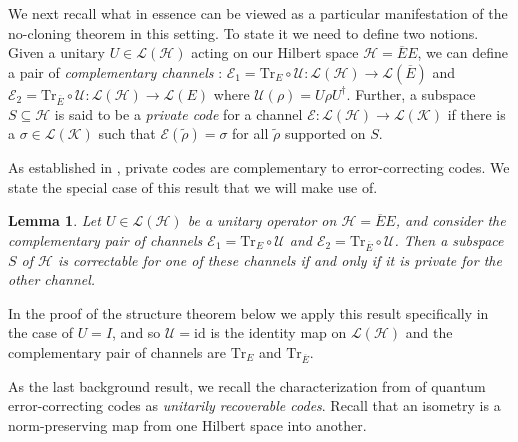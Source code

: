 \documentclass[11pt]{amsart}
\newtheorem{lem}[thm]{Lemma}
\theoremstyle{definition}
\theoremstyle{definition}
\theoremstyle{definition}
\newcommand{\tr}{\textrm{Tr}}
\newcommand{\1}{\mathbb{I}}
\begin{document}
We next recall what in essence can be viewed as a particular manifestation of the no-cloning theorem in this setting. To state it we need to define two notions. Given a unitary $U \in \mathcal L(\mathcal H)$ 
acting on our Hilbert space $\mathcal H = \overline{E}E$, we can define a pair of {\it complementary channels} \cite{holevo2007complementary,king2005properties}: $\mathcal E_1 = \tr_E \circ \mathcal U : \mathcal L(\mathcal H) \rightarrow \mathcal L(\overline{E})$ and $\mathcal E_2 = \tr_{\overline{E}} \circ \mathcal U : \mathcal L(\mathcal H) \rightarrow \mathcal L(E)$ where $\mathcal U(\rho) = U \rho U^\dagger$.  Further, a subspace $S\subseteq \mathcal H$ is said to be a {\it private code} \cite{ambainis2000private,bartlett2005random,bartlett2004decoherence,boykin2003optimal,crann2016private,jochym2013private,kribs2021approximate,levick2017quantum} for a channel $\mathcal E: \mathcal L(\mathcal H) \rightarrow \mathcal L(\mathcal K)$ if there is a $\sigma \in \mathcal L(\mathcal K)$ such that $\mathcal E(\widetilde{\rho}) = \sigma$ for all $\widetilde{\rho}$ supported on $S$. 

As established in \cite{kretschmann2008complementarity}, private codes are complementary to error-correcting codes. We state the special case of this result that we will make use of. 

\begin{lem}\label{complemma}
    Let $U \in \mathcal L(\mathcal H)$ be a unitary operator on $\mathcal H = \overline{E}E$, and consider the complementary pair of channels $\mathcal E_1 = \tr_E \circ \mathcal U$ and $\mathcal E_2 = \tr_{\overline{E}} \circ \mathcal U$. Then a subspace $S$ of $\mathcal H$ is correctable for one of these channels if and only if it is private for the other channel.     
\end{lem}

In the proof of the structure theorem below we apply this result specifically in the case of $U=I$, and so $\mathcal U = \mathrm{id}$ is the identity map on $\mathcal L(\mathcal H)$ and the complementary pair of channels are $\tr_E$ and $\tr_{\overline{E}}$. 

As the last background result, we recall the characterization from \cite{NS06,KS06} of quantum error-correcting codes as {\it unitarily recoverable codes}. Recall that an isometry is a norm-preserving map from one Hilbert space into another. 
\end{document}
